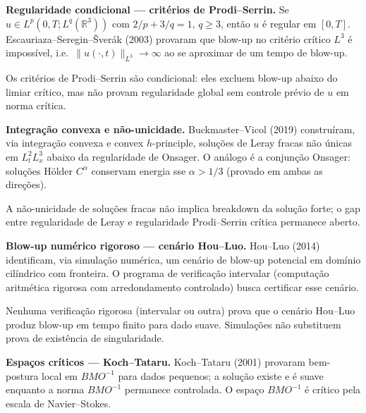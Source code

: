 \documentclass[11pt,a4paper]{article}
\begin{document}
\begin{programs}

\item \textbf{Regularidade condicional — critérios de Prodi–Serrin.}
Se $u\in L^p(0,T;L^q(\mathbb R^3))$ com $2/p+3/q=1$, $q\ge3$,
então $u$ é regular em $[0,T]$.
Escauriaza–Seregin–Šverák (2003) provaram que blow-up no critério
crítico $L^3$ é impossível, i.e.\ $\|u(\cdot,t)\|_{L^3}\to\infty$
ao se aproximar de um tempo de blow-up.

\begin{gap}
Os critérios de Prodi–Serrin são condicional: eles excluem
blow-up abaixo do limiar crítico, mas não provam regularidade global
sem controle prévio de $u$ em norma crítica. \OPEN
\end{gap}

\item \textbf{Integração convexa e não-unicidade.}
Buckmaster–Vicol (2019) construíram, via integração convexa e
convex $h$-principle, soluções de Leray fracas não únicas
em $L^2_t L^3_x$ abaixo da regularidade de Onsager.
O análogo é a conjunção Onsager: soluções Hölder $C^\alpha$
conservam energia sse $\alpha>1/3$ (provado em ambas as direções).

\begin{gap}
A não-unicidade de soluções fracas não implica breakdown da solução
forte; o gap entre regularidade de Leray e regularidade Prodi–Serrin
crítica permanece aberto. \OPEN
\end{gap}

\item \textbf{Blow-up numérico rigoroso — cenário Hou–Luo.}
Hou–Luo (2014) identificam, via simulação numérica, um cenário
de blow-up potencial em domínio cilíndrico com fronteira.
O programa de verificação intervalar (computação aritmética rigorosa
com arredondamento controlado) busca certificar esse cenário.

\begin{gap}
Nenhuma verificação rigorosa (intervalar ou outra) prova que
o cenário Hou–Luo produz blow-up em tempo finito para dado suave.
Simulações não substituem prova de existência de singularidade. \OPEN
\end{gap}

\item \textbf{Espaços críticos — Koch–Tataru.}
Koch–Tataru (2001) provaram bem-postura local em $BMO^{-1}$
para dados pequenos; a solução existe e é suave enquanto a norma
$BMO^{-1}$ permanece controlada.
O espaço $BMO^{-1}$ é crítico pela escala de Navier–Stokes.

\end{programs}
\end{document}

